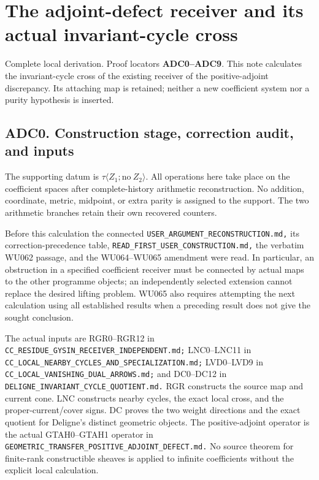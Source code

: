 \section{The adjoint-defect receiver and its actual invariant-cycle
cross}\label{the-adjoint-defect-receiver-and-its-actual-invariant-cycle-cross}

Complete local derivation. Proof locators \textbf{ADC0--ADC9}. This note
calculates the invariant-cycle cross of the existing receiver of the
positive-adjoint discrepancy. Its attaching map is retained; neither a
new coefficient system nor a purity hypothesis is inserted.

\subsection{ADC0. Construction stage, correction audit, and
inputs}\label{adc0.-construction-stage-correction-audit-and-inputs}

The supporting datum is \(\tau\langle Z_1;\mathrm{no}\ Z_2\rangle\). All
operations here take place on the coefficient spaces after
complete-history arithmetic reconstruction. No addition, coordinate,
metric, midpoint, or extra parity is assigned to the support. The two
arithmetic branches retain their own recovered counters.

Before this calculation the connected
\nolinkurl{USER_ARGUMENT_RECONSTRUCTION.md,} its correction-precedence
table, \nolinkurl{READ_FIRST_USER_CONSTRUCTION.md,} the verbatim WU062
passage, and the WU064--WU065 amendment were read. In particular, an
obstruction in a specified coefficient receiver must be connected by
actual maps to the other programme objects; an independently selected
extension cannot replace the desired lifting problem. WU065 also
requires attempting the next calculation using all established results
when a preceding result does not give the sought conclusion.

The actual inputs are RGR0--RGR12 in
\nolinkurl{CC_RESIDUE_GYSIN_RECEIVER_INDEPENDENT.md;} LNC0--LNC11 in
\nolinkurl{CC_LOCAL_NEARBY_CYCLES_AND_SPECIALIZATION.md;} LVD0--LVD9 in
\nolinkurl{CC_LOCAL_VANISHING_DUAL_ARROWS.md;} and DC0--DC12 in
\nolinkurl{DELIGNE_INVARIANT_CYCLE_QUOTIENT.md.} RGR constructs the
source map and current cone. LNC constructs nearby cycles, the exact
local cross, and the proper-current/cover signs. DC proves the two
weight directions and the exact quotient for Deligne's distinct
geometric objects. The positive-adjoint operator is the actual
GTAH0--GTAH1 operator in
\nolinkurl{GEOMETRIC_TRANSFER_POSITIVE_ADJOINT_DEFECT.md.} No source
theorem for finite-rank constructible sheaves is applied to infinite
coefficients without the explicit local calculation.

